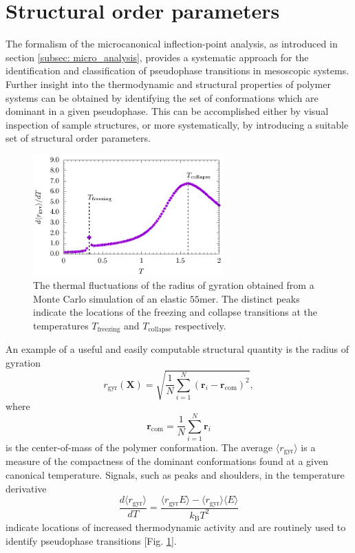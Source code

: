 \documentclass[12pt]{report}
\begin{document}
\section{Structural order parameters}
\label{sec:orderParameters}
The formalism of the microcanonical inflection-point analysis, as introduced in section \ref{subsec: micro_analysis}, provides a systematic approach for the identification and classification of pseudophase transitions in mesoscopic systems. Further insight into the thermodynamic and structural properties of polymer systems can be obtained by identifying the set of conformations which are dominant in a given pseudophase. This can be accomplished either by visual inspection of sample structures, or more systematically, by introducing a suitable set of structural order parameters. 
%
\begin{figure}
\center
\includegraphics[width = 0.65\textwidth]{chapter4Figs/rogFluct.eps}
\caption{\label{fig:ROGFluct}%
The thermal fluctuations of the radius of gyration obtained from a Monte Carlo simulation of an elastic $55$mer. The distinct peaks indicate the locations of the freezing and collapse transitions at the temperatures $T_{\mathrm{freezing}}$ and $T_{\mathrm{collapse}}$ respectively.
}
\end{figure}
% 

An example of a useful and easily computable structural quantity is the radius of gyration
%
\begin{equation}
r_\mathrm{gyr}(\mathbf{X})=\sqrt{\frac{1}{N}\sum\limits_{i=1}^N
\left(\mathbf{r}_i-\mathbf{r}_\mathrm{com} \right)^2},
\end{equation}
%
where 
%
\begin{equation}
\mathbf{r}_\mathrm{com}=\frac{1}{N}\sum_{i=1}^N\mathbf{r}_i
\end{equation}
%
is the center-of-mass of the polymer conformation. The average $\langle r_{\mathrm{gyr}} \rangle$ is a measure of the compactness of the dominant conformations found at a given canonical temperature.
\newpage
\noindent
Signals, such as peaks and shoulders, in the temperature derivative 
%
\begin{equation}
\frac{d\langle r_{\mathrm{gyr}} \rangle}{dT} = \frac{\langle r_{\mathrm{gyr}} E \rangle - \langle r_{\mathrm{gyr}} \rangle \langle E \rangle }{k_{\mathrm{B}} T^{2}}
\end{equation} 
%
indicate locations of increased thermodynamic activity and are routinely used to identify pseudophase transitions [Fig.\,\,\ref{fig:ROGFluct}].
\end{document}
